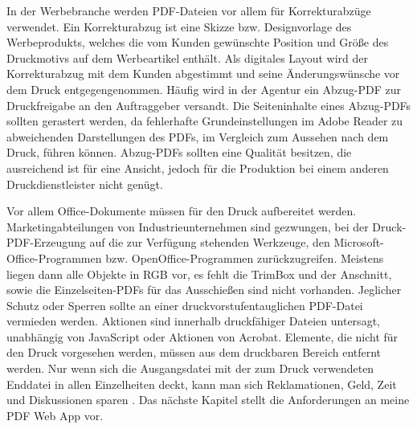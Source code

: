 \par
In der Werbebranche werden PDF-Dateien vor allem für Korrekturabzüge verwendet. Ein Korrekturabzug ist eine Skizze bzw. Designvorlage des Werbeprodukts, welches die vom Kunden gewünschte Position und Größe des Druckmotivs auf dem Werbeartikel enthält. Als digitales Layout wird der Korrekturabzug mit dem Kunden abgestimmt und seine Änderungswünsche vor dem Druck entgegengenommen. Häufig wird in der Agentur ein Abzug-PDF zur Druckfreigabe an den Auftraggeber versandt. Die Seiteninhalte eines Abzug-PDFs sollten gerastert werden, da fehlerhafte Grundeinstellungen im Adobe Reader zu abweichenden Darstellungen des PDFs, im Vergleich zum Aussehen nach dem Druck, führen können. Abzug-PDFs sollten eine Qualität besitzen, die ausreichend ist für eine Ansicht, jedoch für die Produktion bei einem anderen Druckdienstleister nicht genügt. 
\par
Vor allem Office-Dokumente müssen für den Druck aufbereitet werden. Marketingabteilungen von Industrieunternehmen sind gezwungen, bei der Druck-PDF-Erzeugung auf die zur Verfügung stehenden Werkzeuge, den Microsoft-Office-Programmen bzw. OpenOffice-Programmen zurückzugreifen. Meistens liegen dann alle Objekte in RGB vor, es fehlt die TrimBox und der Anschnitt, sowie die Einzelseiten-PDFs für das Ausschießen sind nicht vorhanden. Jeglicher Schutz oder Sperren sollte an einer druckvorstufentauglichen PDF-Datei vermieden werden. Aktionen sind innerhalb druckfähiger Dateien untersagt, unabhängig von JavaScript oder Aktionen von Acrobat. Elemente, die nicht für den Druck vorgesehen werden, müssen aus dem druckbaren Bereich entfernt werden. Nur wenn sich die Ausgangsdatei mit der zum Druck verwendeten Enddatei in allen Einzelheiten deckt, kann man sich Reklamationen, Geld, Zeit und Diskussionen sparen \cite{schneeberger}. Das nächste Kapitel stellt die Anforderungen an meine PDF Web App vor.